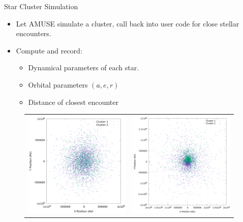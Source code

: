 \documentclass{beamer}
\begin{document}
\begin{frame}{Star Cluster Simulation}
    \begin{itemize}
        \item Let AMUSE simulate a cluster, call back into user code for close
            stellar encounters.
        \item Compute and record:
            \begin{itemize}
                \item Dynamical parameters of each star.
                \item Orbital parameters $(a, e, r)$
                \item Distance of closest encounter
            \end{itemize}
    \end{itemize}
    \begin{figure}
        \begin{tabular}{cc}
            \includegraphics[height=2.0in]{clusters_superimposed_n_2000} &
            \includegraphics[height=2.0in]{clusters_superimposed_final_n_2000}
        \end{tabular}
    \end{figure}

\end{frame}
\end{document}

